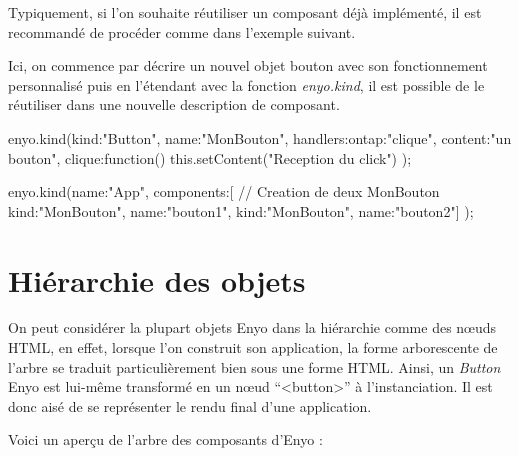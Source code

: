 \documentclass[11pt,a4paper]{report}
\begin{document}
Typiquement, si l'on souhaite réutiliser un composant déjà implémenté,
il est recommandé de procéder comme dans l'exemple suivant.

Ici, on commence par décrire un nouvel objet bouton avec son fonctionnement
personnalisé puis en l'étendant avec la fonction \emph{enyo.kind}, il est possible de
le réutiliser dans une nouvelle description de composant.

\begin{JavaScript}
enyo.kind({kind:"Button", name:"MonBouton", 
           handlers:{ontap:"clique"}, 
           content:"un bouton",
           clique:function(){
             this.setContent("Reception du click")
           }
});

enyo.kind({name:"App", 
           components:[
             // Creation de deux MonBouton
             {kind:"MonBouton", name:"bouton1"},
             {kind:"MonBouton", name:"bouton2"}]
});
\end{JavaScript}

\section{Hiérarchie des objets}

On peut considérer la plupart objets Enyo dans la hiérarchie comme des n\oe{}uds HTML,
en effet, lorsque l'on construit son application, la forme arborescente de l'arbre se traduit
particulièrement bien sous une forme HTML. Ainsi, un \emph{Button} Enyo est lui-même transformé
en un n\oe{}ud ``<button>'' à l'instanciation. Il est donc aisé de se représenter le rendu final 
d'une application.

Voici un aperçu de l'arbre des composants d'Enyo :\medskip

\begin{center}
\end{center}
\end{document}
